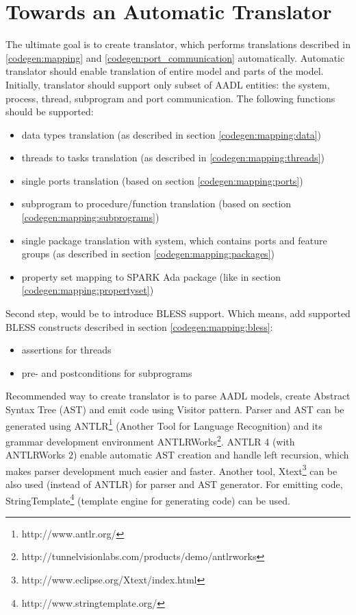 \section{Towards an Automatic Translator}
\label{codegen:translator}

The ultimate goal is to create translator, which performs translations described in \ref{codegen:mapping} and \ref{codegen:port_communication} automatically. Automatic translator should enable translation of entire model and parts of the model. Initially, translator should support only subset of AADL entities: the system, process, thread, subprogram and port communication. The following functions should be supported:
\begin{itemize}
	\item data types translation (as described in section \ref{codegen:mapping:data})
	\item threads to tasks translation (as described in \ref{codegen:mapping:threads})
	\item single ports translation (based on section \ref{codegen:mapping:ports})
	\item subprogram to procedure/function translation (based on section \ref{codegen:mapping:subprograms})
	\item single package translation with system, which contains ports and feature groups (as described in section \ref{codegen:mapping:packages})
	\item property set mapping to SPARK Ada package (like in section \ref{codegen:mapping:propertyset})
\end{itemize}

Second step, would be to introduce BLESS support. Which means, add supported BLESS constructs described in section \ref{codegen:mapping:bless}:
\begin{itemize}
	\item assertions for threads
	\item pre- and postconditions for subprograms
\end{itemize}

Recommended way to create translator is to parse AADL models, create Abstract Syntax Tree (AST) and emit code using Visitor pattern. Parser and AST can be generated using ANTLR\footnote{http://www.antlr.org/} (Another Tool for Language Recognition) and its grammar development environment ANTLRWorks\footnote{http://tunnelvisionlabs.com/products/demo/antlrworks}. ANTLR 4 (with ANTLRWorks 2) enable automatic AST creation and handle left recursion, which makes parser development much easier and faster. Another tool, Xtext\footnote{http://www.eclipse.org/Xtext/index.html} can be also used (instead of ANTLR) for parser and AST generator. For emitting code, StringTemplate\footnote{http://www.stringtemplate.org/} (template engine for generating code) can be used. 

